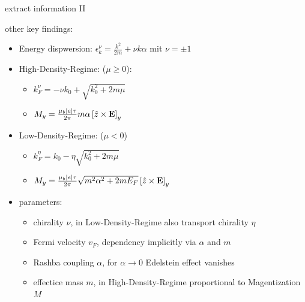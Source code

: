 \documentclass[t,
10pt,
handout, %
]{beamer}
\numberwithin{equation}{section}
\begin{document}
\begin{frame}[c]{extract information II}
\begin{minipage}[h]{0.11 \linewidth}
		\end{minipage}
		\hfill
		\begin{minipage}{0.84\linewidth}
			other key findings: 
			\begin{itemize}
				\item Energy dispwersion: $\epsilon_k^\nu = \frac{k^2}{2m} + \nu k \alpha$ mit $\nu = \pm 1$
				\item High-Density-Regime: ($\mu \geq 0$):
				\begin{itemize}
					\item $k_F^\nu = - \nu k_0 + \sqrt{k_0^2 + 2m\mu}$
					\item $M_y = \frac{\mu_b \abs{e} \tau}{2 \pi} m \alpha \left[\hat{z} \times \bold{E}\right]_y$
				\end{itemize}
				\item Low-Density-Regime: ($\mu < 0$)
				\begin{itemize}
					\item $k_F^\eta =k_0 - \eta \sqrt{k_0^2 + 2m\mu}$
					\item $M_y = \frac{\mu_b \abs{e} \tau}{2 \pi} \sqrt{m^2 \alpha^2 + 2m E_F} \left[\hat{z} \times \bold{E}\right]_y$
				\end{itemize}
				\item parameters:
				\begin{itemize}
					\item chirality $\nu$, in Low-Density-Regime also transport chirality $\eta$
					\item Fermi velocity $v_F$, dependency implicitly via $\alpha$ and $m$
					\item Rashba coupling $\alpha$, for $\alpha \rightarrow 0$ Edelstein effect vanishes
					\item effectice mass $m$, in High-Density-Regime proportional to Magentization $M$
				\end{itemize}
			\end{itemize}
		\end{minipage}
	\end{frame}
	
\end{document}
